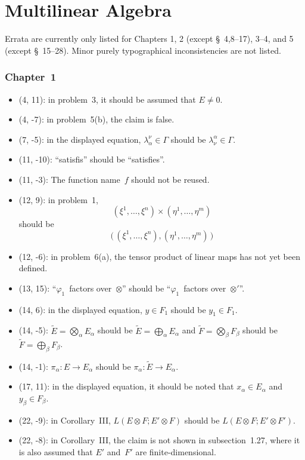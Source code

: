 \documentclass[letterpaper,12pt]{article}
\newcommand{\bigdsum}{\bigoplus}
\newcommand{\tprod}{\otimes}
\newcommand{\bigtprod}{\bigotimes}
\begin{document}
\newpage
\part*{Multilinear Algebra}
Errata are currently only listed for Chapters 1, 2 (except \S~4,8--17), 3--4, and 5 (except \S~15--28). Minor purely typographical inconsistencies are not listed.

\section*{Chapter~1}
\begin{itemize}
\item (4, 11): in problem~3, it should be assumed that \(E\ne 0\).
\item (4, -7): in problem~5(b), the claim is false.
\item (7, -5): in the displayed equation, \(\lambda^{\nu}_{\alpha}\in\Gamma\) should be \(\lambda^{\alpha}_{\nu}\in\Gamma\).
\item (11, -10): ``satisfis'' should be ``satisfies''.
\item (11, -3): The function name~\(f\) should not be reused.
\item (12, 9): in problem~1,
\[(\xi^1,\ldots,\xi^n)\times(\eta^1,\ldots,\eta^m)\]
should be
\[\bigl(\,(\xi^1,\ldots,\xi^n),(\eta^1,\ldots,\eta^m)\,\bigr)\]
\item (12, -6): in problem~6(a), the tensor product of linear maps has not yet been defined.
\item (13, 15): ``\(\varphi_1\)~factors over~\(\tprod\)'' should be ``\(\varphi_1\)~factors over~\(\tprod'\)''.
\item (14, 6): in the displayed equation, \(y\in F_1\) should be \(y_1\in F_1\).
\item (14, -5): \(\widetilde{E}=\bigtprod_{\alpha}E_{\alpha}\) should be \(\widetilde{E}=\bigdsum_{\alpha}E_{\alpha}\) and \(\widetilde{F}=\bigtprod_{\beta}F_{\beta}\) should be \(\widetilde{F}=\bigdsum_{\beta}F_{\beta}\).
\item (14, -1): \(\pi_{\alpha}:E\to E_{\alpha}\) should be \(\pi_{\alpha}:\widetilde{E}\to E_{\alpha}\).
\item (17, 11): in the displayed equation, it should be noted that \(x_{\alpha}\in E_{\alpha}\) and \(y_{\beta}\in F_{\beta}\).
\item (22, -9): in Corollary~III, \(L(E\tprod F;E'\tprod F)\) should be \(L(E\tprod F;E'\tprod F')\).
\item (22, -8): in Corollary~III, the claim is not shown in subsection~1.27, where it is also assumed that \(E'\) and~\(F'\) are finite-dimensional.

\end{itemize}
\end{document}
